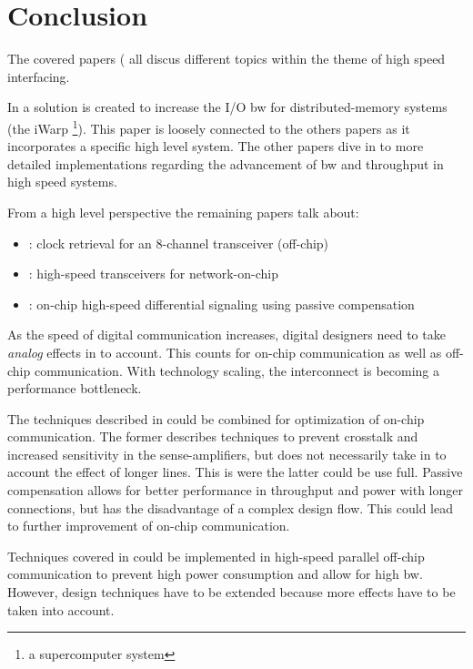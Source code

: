 \section{Conclusion}
The covered papers (\cite{steenkiste1997high, agrawal20098, schinkel2009low, zhang2009high} all discus different topics within the theme of high speed interfacing.

In \cite{steenkiste1997high} a solution is created to increase the I/O \ac{bw} for distributed-memory systems (the iWarp \footnote{a supercomputer system}).
This paper is loosely connected to the others papers as it incorporates a specific high level system.
The other papers dive in to more detailed implementations regarding the advancement of \ac{bw} and throughput in high speed systems.

From a high level perspective the remaining papers talk about:
\begin{itemize}
    \item \cite{agrawal20098}: clock retrieval for an 8-channel transceiver (off-chip)
    \item \cite{schinkel2009low}: high-speed transceivers for network-on-chip
    \item \cite{zhang2009high}: on-chip high-speed differential signaling using passive compensation
\end{itemize}

As the speed of digital communication increases, digital designers need to take \textit{analog} effects in to account.
This counts for on-chip communication as well as off-chip communication.
With technology scaling, the interconnect is becoming a performance bottleneck.

The techniques described in \cite{schinkel2009low, zhang2009high} could be combined for optimization of on-chip communication.
The former describes techniques to prevent crosstalk and increased sensitivity in the sense-amplifiers, but does not necessarily take in to account the effect of longer lines.
This is were the latter could be use full. 
Passive compensation allows for better performance in throughput and power with longer connections, but has the disadvantage of a complex design flow.
This could lead to further improvement of on-chip communication.

Techniques covered in \cite{agrawal20098} could be implemented in high-speed parallel off-chip communication to prevent high power consumption and allow for high \ac{bw}.
However, design techniques have to be extended because more effects have to be taken into account.

